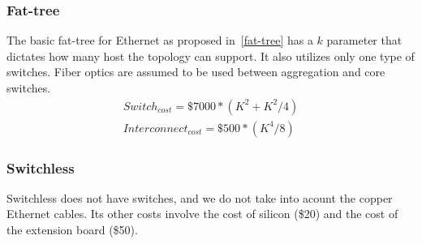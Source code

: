 \subsubsection{Fat-tree}
The basic fat-tree for Ethernet as proposed in~\ref{fat-tree} has a $k$ parameter that dictates how many host the topology can support. It also utilizes only one type of switches. Fiber optics are assumed to be used between aggregation and core switches.
\begin{align}
Switch_{cost} = \$7000 * (K^2 + K^2 / 4) \\
Interconnect_{cost} = \$500 * (K^4 / 8)
\end{align}

\subsubsection{Switchless}
Switchless does not have switches, and we do not take into acount the copper Ethernet cables. Its other costs involve the cost of silicon (\$20) and the cost of the extension board (\$50).
